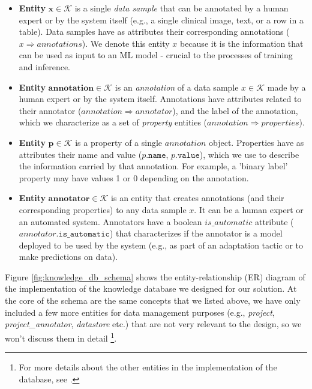 \documentclass[../main.tex]{subfiles}
\begin{document}
    \begin{itemize}
        \item \textbf{Entity} $\boldsymbol{x \in \mathcal{K}}$ is a single \textit{data sample} that can be annotated by a human expert or by the system itself (e.g., a single clinical image, text, or a row in a table). Data samples have as attributes their corresponding annotations ($x \Rightarrow annotations$). We denote this entity $x$  because it is the information that can be used as input to an ML model - crucial to the processes of training and inference.
        \item \textbf{Entity} $\boldsymbol{annotation \in \mathcal{K}}$ is an \textit{annotation} of a data sample $x \in \mathcal{K}$ made by a human expert or by the system itself. Annotations have attributes related to their annotator ($annotation\Rightarrow annotator$), and the label of the annotation, which we characterize as a set of \textit{property} entities ($annotation\Rightarrow properties$). 
        \item \textbf{Entity} $\boldsymbol{p \in \mathcal{K}}$ is a property of a single $annotation$ object. Properties have as attributes their name and value ($p.\texttt{name}$, $p.\texttt{value}$), which we use to describe the information carried by that annotation. For example, a 'binary label' property may have values 1 or 0 depending on the annotation.
        \item \textbf{Entity} $\boldsymbol{annotator \in \mathcal{K}}$ is an entity that creates annotations  (and their corresponding properties) to any data sample $x$. It can be a human expert or an automated system. Annotators have a boolean $is\_automatic$ attribute ($annotator.\texttt{is\_automatic}$) that characterizes if the annotator is a model deployed to be used by the system (e.g., as part of an adaptation tactic or to make predictions on data). 
    \end{itemize}

    \vspace{-0.3cm}

    Figure \ref{fig:knowledge_db_schema} shows the entity-relationship (ER) diagram of the implementation of the knowledge database we designed for our solution. At the core of the schema are the same concepts that we listed above, we have only included a few more entities for data management purposes (e.g., \textit{project}, \textit{project\_annotator}, \textit{datastore} etc.) that are not very relevant to the design, so we won't discuss them in detail \footnote{For more details about the other entities in the implementation of the database, see .}. 
    
\end{document}
